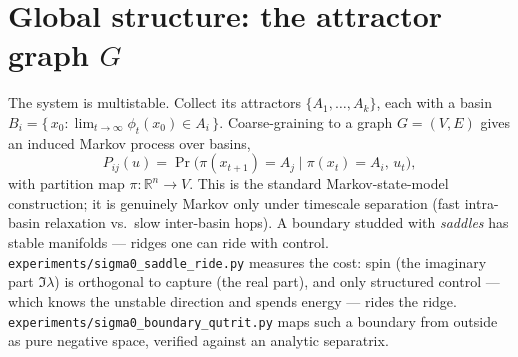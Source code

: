 \documentclass[11pt]{article}
\theoremstyle{definition}
\newcommand{\R}{\mathbb{R}}
\begin{document}
\section{Global structure: the attractor graph $G$}
The system is multistable. Collect its attractors $\{A_1,\dots,A_k\}$, each with a
basin $B_i = \{\, x_0 : \lim_{t\to\infty}\phi_t(x_0) \in A_i \,\}$. Coarse-graining
to a graph $G=(V,E)$ gives an induced Markov process over basins,
\begin{equation}
P_{ij}(u) = \Pr\!\big(\pi(x_{t+1}) = A_j \mid \pi(x_t) = A_i,\, u_t\big),
\end{equation}
with partition map $\pi:\R^n\to V$. This is the standard Markov-state-model
construction; it is genuinely Markov only under timescale separation (fast
intra-basin relaxation vs.\ slow inter-basin hops). A boundary studded with
\emph{saddles} has stable manifolds --- ridges one can ride with control.
\texttt{experiments/sigma0\_saddle\_ride.py} measures the cost: spin (the imaginary
part $\Im\lambda$) is orthogonal to capture (the real part), and only structured
control --- which knows the unstable direction and spends energy --- rides the
ridge. \texttt{experiments/sigma0\_boundary\_qutrit.py} maps such a boundary from
outside as pure negative space, verified against an analytic separatrix.

\end{document}
